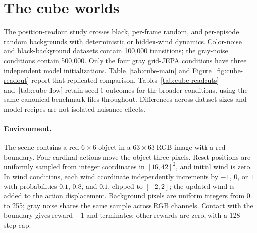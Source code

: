 \section{The cube worlds}
\label{app:cubes}

The position-readout study crosses black, per-frame random, and per-episode random backgrounds
with deterministic or hidden-wind dynamics. Color-noise and black-background datasets contain
100,000 transitions; the gray-noise conditions contain 500,000. Only the four gray grid-JEPA
conditions have three independent model initializations. Table~\ref{tab:cube-main} and
Figure~\ref{fig:cube-readout} report that replicated comparison. Tables~\ref{tab:cube-readouts}
and~\ref{tab:cube-flow} retain seed-0 outcomes for the broader conditions, using the same canonical
benchmark files throughout. Differences across dataset sizes and model recipes are not isolated
nuisance effects.

\paragraph{Environment.}
The scene contains a red $6\times6$ object in a $63\times63$ RGB image with a red boundary. Four
cardinal actions move the object three pixels. Reset positions are uniformly sampled from integer
coordinates in $[16,42]^2$, and initial wind is zero. In wind conditions, each wind coordinate
independently increments by $-1$, $0$, or $1$ with probabilities $0.1$, $0.8$, and $0.1$, clipped
to $[-2,2]$; the updated wind is added to the action displacement. Background pixels are uniform
integers from 0 to 255; gray noise shares the same sample across RGB channels. Contact with the
boundary gives reward $-1$ and terminates; other rewards are zero, with a 128-step cap.


